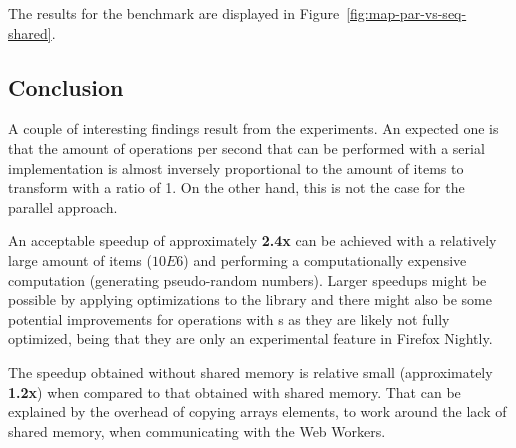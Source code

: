 
The results for the benchmark are displayed in Figure~\ref{fig:map-par-vs-seq-shared}.

\subsection{Conclusion}
A couple of interesting findings result from the experiments. An expected one is that the amount of operations per second that can be performed with a serial implementation is almost inversely proportional to the amount of items to transform with a ratio of 1. On the other hand, this is not the case for the parallel approach.

An acceptable speedup of approximately \textbf{2.4x} can be achieved with a relatively large amount of items (\(10E6\)) and performing a computationally expensive computation (generating pseudo-random numbers). Larger speedups might be possible by applying optimizations to the library and there might also be some potential improvements for operations with \tsabuffer{}s as they are likely not fully optimized, being that they are only an experimental feature in Firefox Nightly.

The speedup obtained without shared memory is relative small (approximately \textbf{1.2x}) when compared to that obtained with shared memory. That can be explained by the overhead of copying arrays elements, to work around the lack of shared memory, when communicating with the Web Workers.

\pagebreak